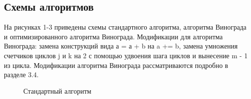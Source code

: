 \documentclass[a4paper, 14pt]{article}
\begin{document}
        \subsection{Схемы алгоритмов}
        На рисунках 1-3 приведены схемы стандартного алгоритма, алгоритма Винограда и оптимизированного алгоритма Винограда. Модификации для алгоритма Винограда: замена конструкций вида а = а + b на a += b, замена умножения счетчиков циклов j и k на 2 с помощью удвоения шага циклов и вынесение m - 1 из цикла.  Модификации алгоритма Винограда рассматриваются подробно в разделе 3.4.\\
    	\begin{figure}[h]
        	\caption{Стандартный алгоритм}
        	\label{fig:schema_standart}
        \end{figure}
        \newpage
\end{document}
